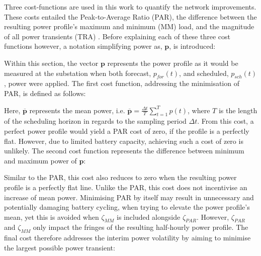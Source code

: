 Three cost-functions are used in this work to quantify the network improvements.
These costs entailed the Peak-to-Average Ratio (PAR), the difference between the resulting power profile's maximum and minimum (MM) load, and the magnitude of all power transients (TRA) \cite{Mohsenian-Rad2010, Mostafa2016}.
Before explaining each of these three cost functions however, a notation simplifying power as, $\textbf{p}$, is introduced:



Within this section, the vector $\textbf{p}$ represents the power profile as it would be measured at the substation when both forecast, $p_{for}(t)$, and scheduled, $p_{sch}(t)$, power were applied.
The first cost function, addressing the minimisation of PAR, is defined as follows:



Here, $\overline{\textbf{p}}$ represents the mean power, i.e. $\overline{\textbf{p}} = \frac{\Delta t}{T}\sum_{t=1}^Tp(t)$, where $T$ is the length of the scheduling horizon in regards to the sampling period $\Delta t$.
From this cost, a perfect power profile would yield a PAR cost of zero, if the profile is a perfectly flat.
However, due to limited battery capacity, achieving such a cost of zero is unlikely.
The second cost function represents the difference between minimum and maximum power of $\textbf{p}$:



Similar to the PAR, this cost also reduces to zero when the resulting power profile is a perfectly flat line.
Unlike the PAR, this cost does not incentivise an increase of mean power.
Minimising PAR by itself may result in unnecessary and potentially damaging battery cycling, when trying to elevate the power profile's mean, yet this is avoided when $\zeta_{MM}$ is included alongside $\zeta_{PAR}$.
However, $\zeta_{PAR}$ and $\zeta_{MM}$ only impact the fringes of the resulting half-hourly power profile.
The final cost therefore addresses the interim power volatility by aiming to minimise the largest possible power transient:



